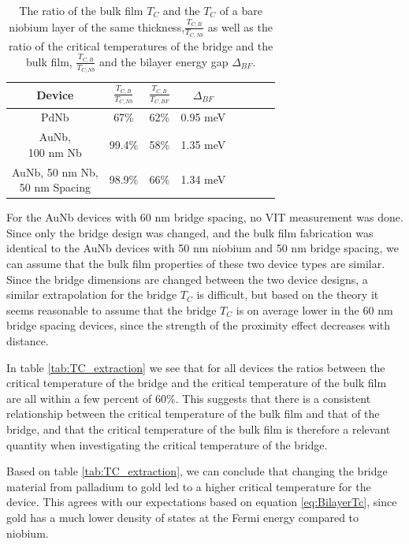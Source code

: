 \begin{table}[H]
\caption{The ratio of the bulk film $T_C$ and the $T_C$ of a bare niobium layer of the same thickness,$\frac{T_{C, B}}{T_{C,Nb}}$ as well as the ratio of the critical temperatures of the bridge and the bulk film, $\frac{T_{C, B}}{T_{C,Nb}}$ and the bilayer energy gap $\Delta_{BF}$.}
\label{tab:TC_extraction_calculations}
\centering
\begin{tabular}{|c|c|c|c|c|c|c|c|}
\hline 
Device &  $\frac{T_{C, B}}{T_{C,Nb}}$ & $\frac{T_{C, B}}{T_{C,BF}}$  & $\Delta_{BF}$\\ 
\hline 
PdNb & 67\% & 62\%  & 0.95 meV\\ 
\hline 
\makecell{AuNb, \\ 100 nm Nb} &  99.4\% & 58\%  & 1.35 meV\\ 
\hline 
\makecell{AuNb, 50 nm Nb, \\ 50 nm Spacing} & 98.9\% & 66\%  & 1.34 meV\\ 
\hline 
\end{tabular} 

\end{table}


For the AuNb devices with 60 nm bridge spacing, no VIT measurement was done. Since only the bridge design was changed, and the bulk film fabrication was identical to the AuNb devices with 50 nm niobium and 50 nm bridge spacing, we can assume that the bulk film properties of these two device types are similar. Since the bridge dimensions are changed between the two device designs, a similar extrapolation for the bridge $T_C$ is difficult, but based on the theory it seems reasonable to assume that the bridge $T_C$ is on average lower in the 60 nm bridge spacing devices, since the strength of the proximity effect decreases with distance.


In table \ref{tab:TC_extraction} we see that for all devices the ratios between the critical temperature of the bridge and the critical temperature of the bulk film are all within a few percent of 60\%. This suggests that there is a consistent relationship between the critical temperature of the bulk film and that of the bridge, and that the critical temperature of the bulk film is therefore a relevant quantity when investigating the critical temperature of the bridge. 

Based on table \ref{tab:TC_extraction}, we can conclude that changing the bridge material from palladium to gold led to a higher critical temperature for the device. This agrees with our expectations based on equation \ref{eq:BilayerTc}, since gold has a much lower density of states at the Fermi energy compared to niobium. 

